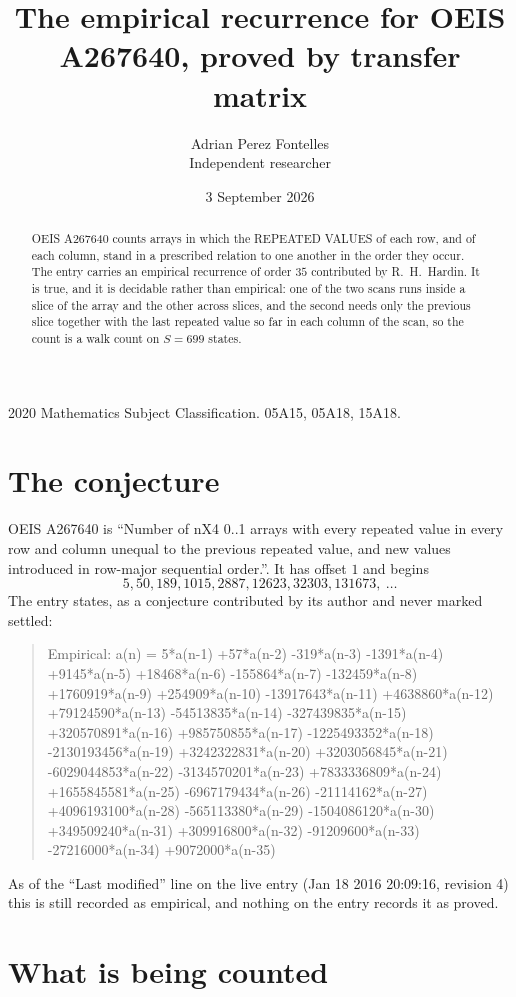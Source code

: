 \documentclass[11pt,a4paper]{article}
\title{The empirical recurrence for OEIS A267640, proved by transfer matrix}
\author{Adrian Perez Fontelles\\ \small Independent researcher}
\date{3 September 2026}
\theoremstyle{plain}
\theoremstyle{definition}
\begin{document}
\maketitle

\begin{abstract}
OEIS A267640 counts arrays in which the REPEATED VALUES of each row, and of each column, stand in a
prescribed relation to one another in the order they occur. The entry carries an empirical
recurrence of order $35$ contributed by R.~H.~Hardin. It is true, and it is decidable
rather than empirical: one of the two scans runs inside a slice of the array and the other
across slices, and the second needs only the previous slice together with the last repeated
value so far in each column of the scan, so the count is a walk count on $S=699$ states.
\end{abstract}

\noindent\small 2020 Mathematics Subject Classification. 05A15, 05A18, 15A18.\normalsize

\section{The conjecture}

OEIS A267640 is ``Number of nX4 0..1 arrays with every repeated value in every row and column unequal to the previous repeated value, and new values introduced in row-major sequential order.''. It has offset $1$ and begins
\[
5, 50, 189, 1015, 2887, 12623, 32303, 131673,\ \dots
\]
The entry states, as a conjecture contributed by its author and never marked settled:
\begin{quote}
Empirical: a(n) = 5*a(n-1) +57*a(n-2) -319*a(n-3) -1391*a(n-4) +9145*a(n-5) +18468*a(n-6) -155864*a(n-7) -132459*a(n-8) +1760919*a(n-9) +254909*a(n-10) -13917643*a(n-11) +4638860*a(n-12) +79124590*a(n-13) -54513835*a(n-14) -327439835*a(n-15) +320570891*a(n-16) +985750855*a(n-17) -1225493352*a(n-18) -2130193456*a(n-19) +3242322831*a(n-20) +3203056845*a(n-21) -6029044853*a(n-22) -3134570201*a(n-23) +7833336809*a(n-24) +1655845581*a(n-25) -6967179434*a(n-26) -21114162*a(n-27) +4096193100*a(n-28) -565113380*a(n-29) -1504086120*a(n-30) +349509240*a(n-31) +309916800*a(n-32) -91209600*a(n-33) -27216000*a(n-34) +9072000*a(n-35)
\end{quote}
As of the ``Last modified'' line on the live entry (Jan 18 2016 20:09:16, revision 4) this is still
recorded as empirical, and nothing on the entry records it as proved.

\section{What is being counted}
\end{document}
